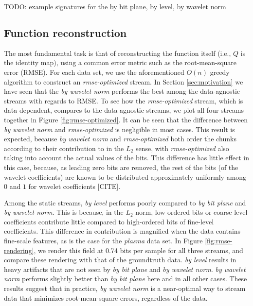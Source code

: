 TODO: example signatures for the by bit plane, by level, by wavelet norm

\subsection{Function reconstruction}
\label{sec:rmse-optimized}

The most fundamental task is that of reconstructing the function itself (i.e., $Q$ is the identity
map), using a common error metric such as the root-mean-square error (RMSE). For each data set, we
use the aforementioned $O(n)$ greedy algorithm to construct an \emph{rmse-optimized} stream. In
Section \ref{sec:motivation} we have seen that the \emph{by wavelet norm} performs the best among
the data-agnostic streams with regards to RMSE. To see how the \emph{rmse-optimized} stream, which
is data-dependent, compares to the data-agnostic streams, we plot all four streams together in
Figure \ref{fig:rmse-optimized}. It can be seen that the difference between \emph{by wavelet norm}
and \emph{rmse-optimized} is negligible in most cases. This result is expected, because \emph{by
wavelet norm} and \emph{rmse-optimized} both order the chunks according to their contribution to in
the $L_2$ sense, with \emph{rmse-optimized} also taking into account the actual values of the bits.
This difference has little effect in this case, because, as leading zero bits are removed, the rest
of the bits (of the wavelet coefficients) are known to be distributed approximately uniformly among
$0$ and $1$ for wavelet coefficients [CITE]. 

Among the static streams, \emph{by level} performs poorly compared to \emph{by bit plane} and
\emph{by wavelet norm}. This is because, in the $L_2$ norm, low-ordered bits or coarse-level
coefficients contribute little compared to high-ordered bits of fine-level coefficients. This
difference in contribution is magnified when the data contains fine-scale features, as is the case
for the \emph{plasma} data set. In Figure \ref{fig:rmse-rendering}, we render this field at 0.74
bits per sample for all three streams, and compare these rendering with that of the groundtruth
data. \emph{by level} results in heavy artifacts that are not seen by \emph{by bit plane} and
\emph{by wavelet norm}. \emph{by wavelet norm} performs slightly better than \emph{by bit plane}
here and in all other cases. These results suggest that in practice, \emph{by wavelet norm} is a
near-optimal way to stream data that minimizes root-mean-square errors, regardless of the data.

